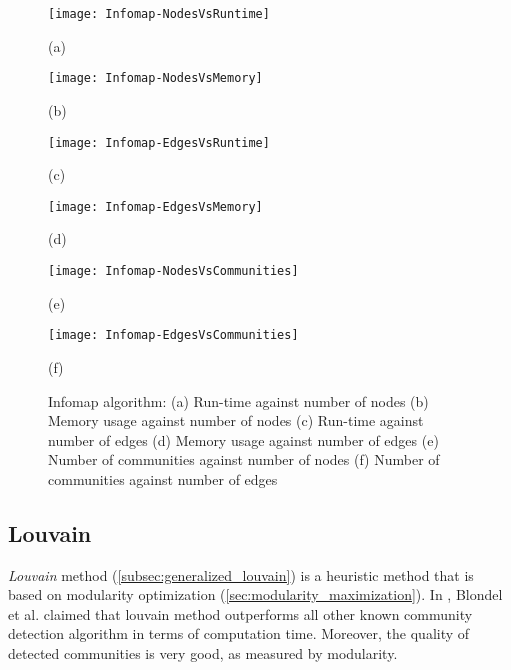 \begin{figure}[H]
  \centering
  \begin{minipage}[b]{0.4\textwidth}
    \texttt{[image: Infomap-NodesVsRuntime]}
    \caption*{(a)}
  \end{minipage}
  \begin{minipage}[b]{0.4\textwidth}
    \texttt{[image: Infomap-NodesVsMemory]}
    \caption*{(b)}
  \end{minipage}
  \begin{minipage}[b]{0.4\textwidth}
    \texttt{[image: Infomap-EdgesVsRuntime]}
    \caption*{(c)}
  \end{minipage}
  \begin{minipage}[b]{0.4\textwidth}
    \texttt{[image: Infomap-EdgesVsMemory]}
    \caption*{(d)}
  \end{minipage}
  \begin{minipage}[b]{0.4\textwidth}
    \texttt{[image: Infomap-NodesVsCommunities]}
    \caption*{(e)}
  \end{minipage}
  \begin{minipage}[b]{0.4\textwidth}
    \texttt{[image: Infomap-EdgesVsCommunities]}
    \caption*{(f)}
  \end{minipage}
  \caption{Infomap algorithm: (a) Run-time against number of nodes (b) Memory usage against number of nodes (c) Run-time against number of edges (d) Memory usage against number of edges (e) Number of communities against number of nodes (f) Number of communities against number of edges}
  \label{fig:infomap_runs}
\end{figure}


\subsection{Louvain}
\textit{Louvain} method (\ref{subsec:generalized_louvain}) is a heuristic method that is based on modularity optimization (\ref{sec:modularity_maximization}). In \cite{ref-27}, Blondel et al. claimed that louvain method outperforms all other known community detection algorithm in terms of computation time. Moreover, the quality of detected communities is very good, as measured by modularity.

